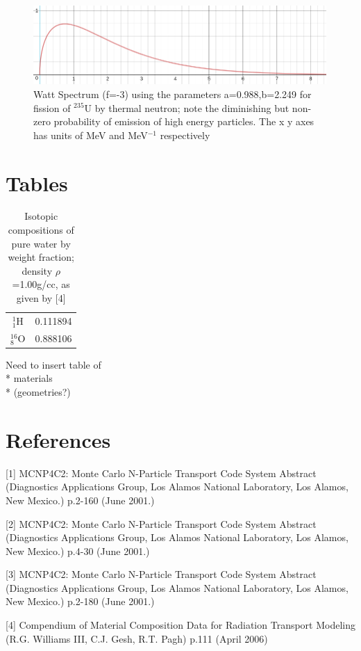 \documentclass[a4paper, 12pt]{article}
\begin{document}
\begin{appendices}
\begin{figure}[H]
\centering
\includegraphics[height=3cm]{WattSpectrum.png}
\caption{Watt Spectrum (f=-3) using the parameters a=0.988,b=2.249 for fission of ${}^{235}$U by thermal neutron;
note the diminishing but non-zero probability of emission of high energy particles.
The x y axes has units of MeV and MeV$^{-1}$ respectively
}\label{Watt}
\end{figure}

\section{Tables}

\begin{table}[H]
\centering
\begin{tabular}{cc}
	${}^{1}_{1}$H  & 0.111894 \\
	${}^{16}_{8}$O & 0.888106
\end{tabular}
\caption{Isotopic compositions of pure water by weight fraction; density $\rho$=1.00g/cc, as given by [4]}\label{MaterialDef}
\end{table}
Need to insert table of
\\* materials
\\* (geometries?)
\section{References}
\indent

[1] MCNP4C2: Monte Carlo N-Particle Transport Code System Abstract (Diagnostics Applications Group, Los Alamos National Laboratory, Los Alamos, New Mexico.) p.2-160 (June 2001.)

[2] MCNP4C2: Monte Carlo N-Particle Transport Code System Abstract (Diagnostics Applications Group, Los Alamos National Laboratory, Los Alamos, New Mexico.) p.4-30 (June 2001.)

[3] MCNP4C2: Monte Carlo N-Particle Transport Code System Abstract (Diagnostics Applications Group, Los Alamos National Laboratory, Los Alamos, New Mexico.) p.2-180 (June 2001.)

[4] Compendium of Material Composition Data for Radiation Transport Modeling (R.G. Williams III, C.J. Gesh, R.T. Pagh) p.111 (April 2006)

\end{appendices}
\end{document}
